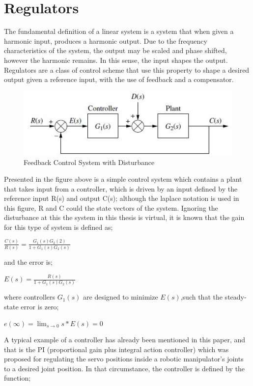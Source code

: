 \documentclass[12pt,openany,a4paper]{book}
\begin{document}
\section{Regulators}
The fundamental definition of a linear system is a system that when given a harmonic input, produces a harmonic output. Due to the frequency characteristics of the system, the output may be scaled and phase shifted, however the harmonic remains. In this sense, the input shapes the output. Regulators are a class of control scheme that use this property to shape a desired output given a reference input, with the use of feedback and a compensator.
\\
\begin{center}
\begin{figure}[htb]
  \includegraphics[width=\linewidth]{feedback_control.jpg}
\caption{Feedback Control System with Disturbance}
\end{figure}
\end{center}
 Presented in the figure above is a simple control system which contains a plant that takes input from a controller, which is driven by an input defined by the reference input R(s) and output C(s); although the laplace notation is used in this figure, R and C could the state vectors of the system. Ignoring the disturbance at this the system in this thesis is virtual, it is known that the gain for this type of system is defined as;

$\frac{C(s)}{R(s)} = \frac{G_1(s) G_2(2)}{ 1 + G_1(s) G_2 (s)}$

and the error is;

$E(s) = \frac{R(s)}{1 + G_1(s) G_2(s)}$

where controllers $G_1(s)$ are designed to minimize $E(s)$,such that the steady-state error is zero;

$e(\infty) = \lim_{s\to0} s * E(s) = 0$

A typical example of a controller has already been mentioned in this paper, and that is the PI (proportional gain plus integral action controller) which was proposed for regulating the servo positions inside a robotic manipulator's joints to a desired joint position. In that circumstance, the controller is defined by the function;
\end{document}
